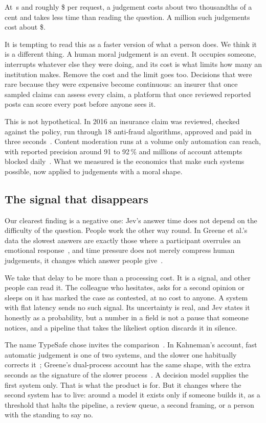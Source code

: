 \documentclass[journal]{IEEEtran}
\begin{document}
At \LatMedianSec\,s and roughly \$\CostPerDecision{} per request, a judgement costs about two
thousandths of a cent and takes less time than reading the question. A million such judgements
cost about \$\CostPerMillion.

It is tempting to read this as a faster version of what a person does. We think it is a different
thing. A human moral judgement is an event. It occupies someone, interrupts whatever else they
were doing, and its cost is what limits how many an institution makes. Remove the cost and the
limit goes too. Decisions that were rare because they were expensive become continuous: an insurer
that once sampled claims can assess every claim, a platform that once reviewed reported posts can
score every post before anyone sees it.

This is not hypothetical. In 2016 an insurance claim was reviewed, checked against the policy, run
through 18 anti-fraud algorithms, approved and paid in three
seconds~\cite{lemonade2017,carriermanagement2017}. Content moderation runs at a volume only
automation can reach, with reported precision around 91 to 92\,\% and millions of account attempts
blocked daily~\cite{meta2026}. What we measured is the economics that make such systems possible,
now applied to judgements with a moral shape.


\subsection{The signal that disappears}

Our clearest finding is a negative one: Jev's answer time does not depend on the difficulty of the
question. People work the other way round. In Greene et al.'s data the slowest answers are exactly
those where a participant overrules an emotional response~\cite{greene2001}, and time pressure
does not merely compress human judgements, it changes which answer people give~\cite{suter2011}.

We take that delay to be more than a processing cost. It is a signal, and other people can read
it. The colleague who hesitates, asks for a second opinion or sleeps on it has marked the case as
contested, at no cost to anyone. A system with flat latency sends no such signal. Its uncertainty
is real, and Jev states it honestly as a probability, but a number in a field is not a pause that
someone notices, and a pipeline that takes the likeliest option discards it in silence.

The name TypeSafe chose invites the comparison~\cite{typesafe_blog}. In Kahneman's account, fast
automatic judgement is one of two systems, and the slower one habitually corrects
it~\cite{kahneman2011}; Greene's dual-process account has the same shape, with the extra seconds
as the signature of the slower process~\cite{greene2001}. A decision model supplies the first
system only. That is what the product is for. But it changes where the second system has to live:
around a model it exists only if someone builds it, as a threshold that halts the pipeline, a
review queue, a second framing, or a person with the standing to say no.
\end{document}
